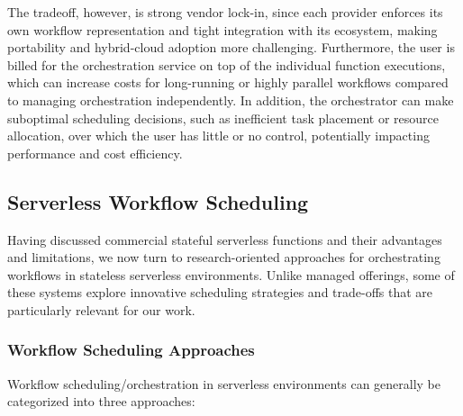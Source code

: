 The tradeoff, however, is strong vendor lock-in, since each provider enforces its own workflow representation and tight integration with its ecosystem, making portability and hybrid-cloud adoption more challenging. Furthermore, the user is billed for the orchestration service on top of the individual function executions, which can increase costs for long-running or highly parallel workflows compared to managing orchestration independently. In addition, the orchestrator can make suboptimal scheduling decisions, such as inefficient task placement or resource allocation, over which the user has little or no control, potentially impacting performance and cost efficiency.

\subsection{Serverless Workflow Scheduling}
Having discussed commercial stateful serverless functions and their advantages and limitations, we now turn to research-oriented approaches for orchestrating workflows in stateless serverless environments. Unlike managed offerings, some of these systems explore innovative scheduling strategies and trade-offs that are particularly relevant for our work.

\subsubsection{Workflow Scheduling Approaches}

Workflow scheduling/orchestration in serverless environments can generally be categorized into three approaches:

